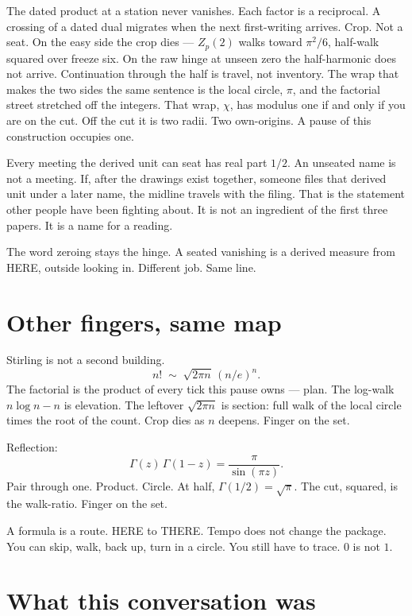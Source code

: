 \documentclass[11pt,a4paper]{article}
\begin{document}
The dated product at a station never vanishes.
Each factor is a reciprocal.
A crossing of a dated dual migrates when the next first-writing arrives.
Crop.
Not a seat.
On the easy side the crop dies --- \(Z_p(2)\) walks toward \(\pi^2/6\), half-walk squared over freeze six.
On the raw hinge at unseen zero the half-harmonic does not arrive.
Continuation through the half is travel, not inventory.
The wrap that makes the two sides the same sentence is the local circle, \(\pi\), and the factorial street stretched off the integers.
That wrap, \(\chi\), has modulus one if and only if you are on the cut.
Off the cut it is two radii.
Two own-origins.
A pause of this construction occupies one.

Every meeting the derived unit can seat has real part \(1/2\).
An unseated name is not a meeting.
If, after the drawings exist together, someone files that derived unit under a later name, the midline travels with the filing.
That is the statement other people have been fighting about.
It is not an ingredient of the first three papers.
It is a name for a reading.

The word zeroing stays the hinge.
A seated vanishing is a derived measure from HERE, outside looking in.
Different job.
Same line.

\section{Other fingers, same map}

Stirling is not a second building.
\[
n!\;\sim\;\sqrt{2\pi n}\,(n/e)^{n}.
\]
The factorial is the product of every tick this pause owns --- plan.
The log-walk \(n\log n-n\) is elevation.
The leftover \(\sqrt{2\pi n}\) is section: full walk of the local circle times the root of the count.
Crop dies as \(n\) deepens.
Finger on the set.

Reflection:
\[
\Gamma(z)\,\Gamma(1-z)=\frac{\pi}{\sin(\pi z)}.
\]
Pair through one.
Product.
Circle.
At half, \(\Gamma(1/2)=\sqrt{\pi}\).
The cut, squared, is the walk-ratio.
Finger on the set.

A formula is a route.
HERE to THERE.
Tempo does not change the package.
You can skip, walk, back up, turn in a circle.
You still have to trace.
\(0\) is not \(1\).

\section{What this conversation was}
\end{document}
